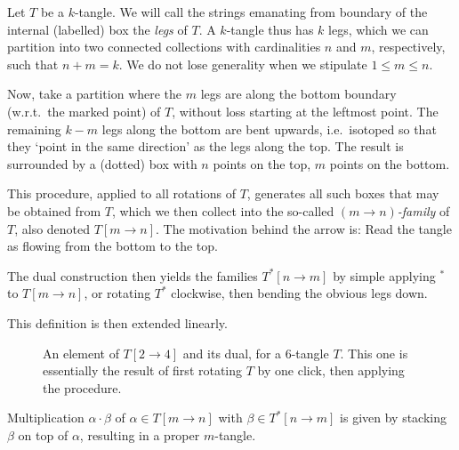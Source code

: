 \begin{definition}
Let $T$ be a $k$-tangle. We will call the strings emanating from boundary of the internal (labelled) box the \emph{legs} of $T$. A $k$-tangle thus has $k$ legs, which we can partition into two connected collections with cardinalities $n$ and $m$, respectively, such that $n+m=k$. We do not lose generality when we stipulate $1\leq m\leq n$.

Now, take a partition where the $m$ legs are along the bottom boundary (w.r.t.\ the marked point) of $T$, without loss starting at the leftmost point. The remaining $k-m$ legs along the bottom are bent upwards, i.e.\ isotoped so that they `point in the same direction' as the legs along the top. The result is surrounded by a (dotted) box with $n$ points on the top, $m$ points on the bottom.

This procedure, applied to all rotations of $T$, generates all such boxes that may be obtained from $T$, which we then collect into the so-called \emph{$(m\rightarrow n)$-family} of $T$, also denoted $T[m\rightarrow n]$. The motivation behind the arrow is: Read the tangle as flowing from the bottom to the top.

The dual construction then yields the families $T^*[n\rightarrow m]$ by simple applying ${}^*$ to $T[m\rightarrow n]$, or rotating $T^*$ clockwise, then bending the obvious legs down.

This definition is then extended linearly.
\end{definition}
\begin{figure}[!htp]\centering
	\caption[Bending the legs]{An element of $T[2\rightarrow 4]$ and its dual, for a $6$-tangle $T$. This one is essentially the result of first rotating $T$ by one click, then applying the procedure.}
\end{figure}
Multiplication $\alpha\cdot \beta$ of $\alpha\in T[m\rightarrow n]$ with $\beta\in T^*[n\rightarrow m]$ is given by stacking $\beta$ on top of $\alpha$, resulting in a proper $m$-tangle.

